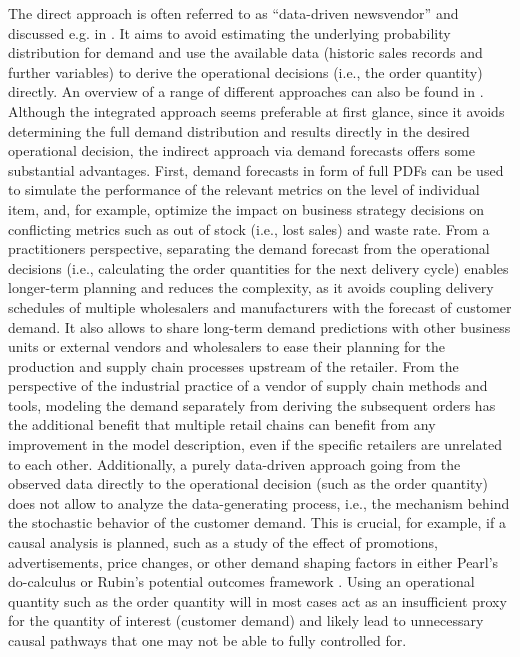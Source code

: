 \documentclass[BCOR=1mm, DIV=calc,10pt,
twoside=true,
twocolumn,
headings=normal]{scrartcl}
\begin{document}
The direct approach is often referred to as ``data-driven newsvendor'' and discussed e.g. in \cite{beutel2012safety,ban2019big,bertsimas2020predictive, oroojlooyjadid2020applying}. It aims to avoid estimating the underlying probability distribution for demand and use the available data (historic sales records and further variables) to derive the operational decisions (i.e., the order quantity) directly. An overview of a range of different approaches can also be found in \cite{huber2019data}. Although the integrated approach seems preferable at first glance, since it avoids determining the full demand distribution and results directly in the desired operational decision, the indirect approach via demand forecasts offers some substantial advantages. First, demand forecasts in form of full PDFs can be used to simulate the performance of the relevant metrics on the level of individual item, and, for example, optimize the impact on business strategy decisions on conflicting metrics such as out of stock (i.e., lost sales) and waste rate. From a practitioners perspective, separating the demand forecast from the operational decisions (i.e., calculating the order quantities for the next delivery cycle) enables longer-term planning and reduces the complexity, as it avoids coupling delivery schedules of multiple wholesalers and manufacturers with the forecast of customer demand. It also allows to share long-term demand predictions with other business units or external vendors and wholesalers to ease their planning for the production and supply chain processes upstream of the retailer. From the perspective of the industrial practice of a vendor of supply chain methods and tools, modeling the demand separately from deriving the subsequent orders has the additional benefit that multiple retail chains can benefit from any improvement in the model description, even if the specific retailers are unrelated to each other. Additionally, a purely data-driven approach going from the observed data directly to the operational decision (such as the order quantity) does not allow to analyze the data-generating process, i.e., the mechanism behind the stochastic behavior of the customer demand. This is crucial, for example, if a causal analysis is planned, such as a study of the effect of promotions, advertisements, price changes, or other demand shaping factors in either Pearl's do-calculus \cite{PearlCausality} or Rubin's potential outcomes framework \cite{rubin1974estimating}. Using an operational quantity such as the order quantity will in most cases act as an insufficient proxy for the quantity of interest (customer demand) and likely lead to unnecessary causal pathways that one may not be able to  fully controlled for.
\end{document}
